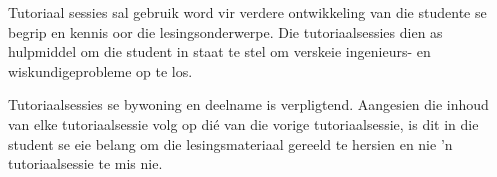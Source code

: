 	Tutoriaal sessies sal gebruik word vir verdere ontwikkeling van 
	die studente se begrip en kennis oor die lesingsonderwerpe. 
	Die tutoriaalsessies dien as hulpmiddel om die student in staat te stel om verskeie
	ingenieurs- en wiskundigeprobleme op te los. 

	Tutoriaalsessies se bywoning en deelname is verpligtend.
	Aangesien die inhoud van elke tutoriaalsessie volg op di\'{e} van die
	vorige tutoriaalsessie, is dit in die student se eie belang om die lesingsmateriaal
	gereeld te hersien en nie 'n tutoriaalsessie te mis nie.
	

